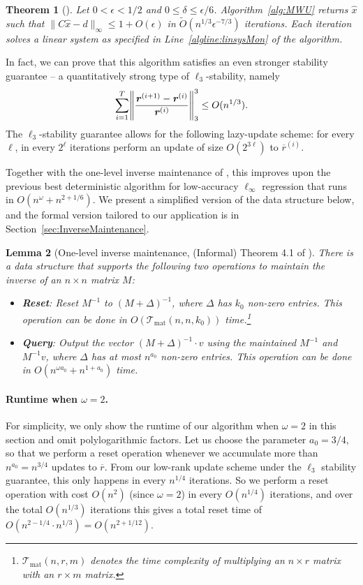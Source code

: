 \documentclass[11pt]{article}
\newtheorem{theorem}{Theorem}[section]
\newtheorem{lemma}[theorem]{Lemma}
\newcommand{\Tmat}{\mathcal{T}_{\mathrm{mat}}}
\let\originalleft\left
\let\originalright\right
\renewcommand{\left}{\mathopen{}\mathclose\bgroup\originalleft}
\renewcommand{\right}{\aftergroup\egroup\originalright}
\newcommand\dd{\boldsymbol{\mathit{d}}}
\newcommand\rr{\boldsymbol{\mathit{r}}}
\newcommand\xx{\boldsymbol{\mathit{x}}}
\newcommand\CC{\boldsymbol{\mathit{C}}}
\newcommand\xxhat{\widehat{\xx}}
\newcommand{\ov}{\overline}
\begin{document}
\begin{theorem}[\cite{chin2013runtime}]\label{thm:InfRegMainMonotone}
Let $0<\epsilon<1/2$ and $0\leq\delta\leq \epsilon/6$. Algorithm~\ref{alg:MWU} returns $\xxhat$ such that $\|\CC\xxhat-\dd\|_{\infty}\leq 1 +O(\epsilon)$ in $\widetilde{O}(n^{1/3}\epsilon^{-7/3})$ iterations. Each iteration solves a linear system as specified in Line~\ref{algline:linsysMon} of the algorithm.
\end{theorem}
In fact, we can prove that this algorithm satisfies an even stronger stability guarantee -- a quantitatively strong type of $\ell_3$-stability, namely
\[
\sum_{i=1}^T \left\|\frac{\rr^{(i+1)} - \rr^{(i)}}{\rr^{(i)}}\right\|_3^3 \leq O(n^{1/3}).
\]
The $\ell_3$-stability guarantee allows for the following lazy-update scheme: for every $\ell$, in every $2^{\ell}$ iterations perform an update of size $O(2^{3 \ell})$ to $\ov{\rr}^{(i)}$. 

Together with the one-level inverse maintenance of \textcite{bns19}, this improves upon the previous best deterministic algorithm for low-accuracy $\ell_{\infty}$ regression that runs in $O(n^{\omega} + n^{2 + 1/6})$. We present a simplified version of the data structure below, and the formal version tailored to our application is in Section~\ref{sec:InverseMaintenance}. 
\begin{lemma}[One-level inverse maintenance, (Informal) Theorem 4.1 of \cite{bns19}]
\label{lem:InverseMaintenanceOneLevelShort}
There is a data structure that supports the following two operations to maintain the inverse of an $n \times n$ matrix $M$:
\begin{itemize}
\item {\bf Reset}: Reset $M^{-1}$ to $(M+\Delta)^{-1}$, where $\Delta$ has $k_0$ non-zero entries. This operation can be done in $O(\Tmat(n, n, k_0))$ time.\footnote{$\Tmat(n,r,m)$ denotes the time complexity of multiplying an $n \times r$ matrix with an $r \times m$ matrix.}
\item {\bf Query}: Output the vector $(M+\Delta)^{-1} \cdot v$ using the maintained $M^{-1}$ and $M^{-1} v$, where $\Delta$ has at most $n^{a_0}$ non-zero entries. This operation can be done in $O(n^{\omega a_0} + n^{1 + a_0})$ time.
\end{itemize}
\end{lemma}

\paragraph{Runtime when $\omega = 2$.}
For simplicity, we only show the runtime of our algorithm when $\omega = 2$ in this section and omit polylogarithmic factors. Let us choose the parameter $a_0 = 3/4$, so that we perform a reset operation whenever we accumulate more than $n^{a_0} = n^{3/4}$ updates to $\ov{\rr}$. From our low-rank update scheme under the $\ell_3$ stability guarantee, this only happens in every $n^{1/4}$ iterations. So we perform a reset operation with cost $O(n^2)$ (since $\omega = 2$) in every $O(n^{1/4})$ iterations, and over the total $O(n^{1/3})$ iterations this gives a total reset time of $O(n^{2 - 1/4} \cdot n^{1/3}) = O(n^{2 + 1/12})$.
\end{document}
